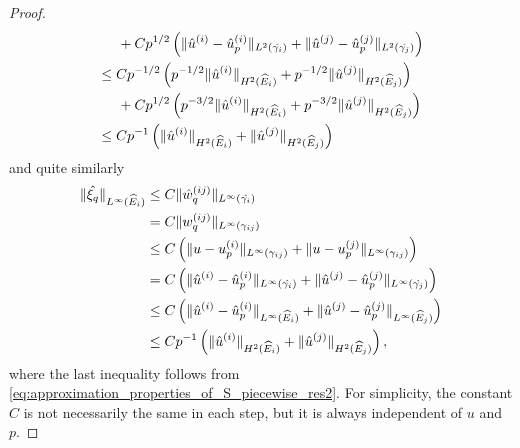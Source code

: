 \documentclass[english, 12pt, a4paper, sci, utf8, a-2b, online]{aaltothesis}
\theoremstyle{definition}
\theoremstyle{plain}
\DeclarePairedDelimiter\norm{\lVert}{\rVert}
\numberwithin{equation}{section}
\begin{document}
\begin{proof}
\begin{align}
        &\hspace{5mm} + Cp^{1/2} \left(
            \norm{\hat{u}^{(i)} - \hat{u}_p^{(i)}}_{L^2(\hat{\gamma_{i}})}
            + \norm{\hat{u}^{(j)} - \hat{u}_p^{(j)}}_{L^2(\hat{\gamma_{j}})}
        \right) \nonumber \\
        &\leq C p^{-1/2} \left(
            p^{-1/2} \norm{\hat{u}^{(i)}}_{H^2(\widehat{E}_i)}
            + p^{-1/2} \norm{\hat{u}^{(j)}}_{H^2(\widehat{E}_j)}
        \right) \nonumber \\
        &\hspace{5mm} + Cp^{1/2} \left(
            p^{-3/2} \norm{\hat{u}^{(i)}}_{H^2(\widehat{E}_i)}
            + p^{-3/2} \norm{\hat{u}^{(j)}}_{H^2(\widehat{E}_j)}
        \right) \nonumber \\
        \label{eq:approximation_properties_of_S_piecewise_edge_res1}
        &\leq C p^{-1} \left( \norm{\hat{u}^{(i)}}_{H^2(\widehat{E}_i)}
            + \norm{\hat{u}^{(j)}}_{H^2(\widehat{E}_j)} \right)
    \end{align}
    and quite similarly
    \begin{align}
        \norm{\hat{\xi_q}}_{L^{\infty}(\widehat{E}_i)}
        &\leq C \norm{\hat{w}_q^{(ij)}}_{L^{\infty}(\hat{\gamma_i})} \nonumber \\
        &= C \norm{w_q^{(ij)}}_{L^{\infty}(\gamma_{ij})} \nonumber \\
        &\leq C \left(
            \norm{u - u_p^{(i)}}_{L^{\infty}(\gamma_{ij})}
            + \norm{u - u_p^{(j)}}_{L^{\infty}(\gamma_{ij})}
        \right) \nonumber \\
        &= C \left(
            \norm{\hat{u}^{(i)} - \hat{u}_p^{(i)}}_{L^{\infty}(\hat{\gamma_{i}})}
            + \norm{\hat{u}^{(j)} - \hat{u}_p^{(j)}}_{L^{\infty}(\hat{\gamma_{j}})}
        \right) \nonumber \\
        &\leq C \left(
            \norm{\hat{u}^{(i)} - \hat{u}_p^{(i)}}_{L^{\infty}(\widehat{E}_i)}
            + \norm{\hat{u}^{(j)} - \hat{u}_p^{(j)}}_{L^{\infty}(\widehat{E}_j)}
        \right) \nonumber \\
        \label{eq:approximation_properties_of_S_piecewise_edge_res2}
        &\leq C p^{-1} \left( \norm{\hat{u}^{(i)}}_{H^2(\widehat{E}_i)}
            + \norm{\hat{u}^{(j)}}_{H^2(\widehat{E}_j)} \right),
    \end{align}
    where the last inequality follows from
    \eqref{eq:approximation_properties_of_S_piecewise_res2}.
    For simplicity, the constant $C$ is not necessarily the same in
    each step, but it is always independent of $u$ and $p$.

\end{proof}
\end{document}
